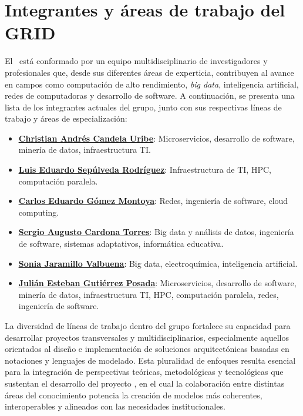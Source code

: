 

\section{Integrantes y áreas de trabajo del GRID}
El \GRID\ está conformado por un equipo multidisciplinario de investigadores y profesionales que, desde sus diferentes áreas de experticia, contribuyen al avance en campos como computación de alto rendimiento, \textit{big data}, inteligencia artificial, redes de computadoras y desarrollo de software. A continuación, se presenta una lista de los integrantes actuales del grupo, junto con sus respectivas líneas de trabajo y áreas de especialización:
\begin{itemize}
	\item \href{https://scienti.minciencias.gov.co/cvlac/visualizador/generarCurriculoCv.do?cod_rh=0000210897}{\underline{{\textbf{Christian Andrés Candela Uribe}}}}: Microservicios, desarrollo de software, minería de datos, infraestructura TI.\@
	\item \href{https://scienti.minciencias.gov.co/cvlac/visualizador/generarCurriculoCv.do?cod_rh=0001383939}{\underline{{\textbf{Luis Eduardo Sepúlveda Rodríguez}}}}: Infraestructura de TI, HPC, computación paralela.
	\item \href{https://scienti.minciencias.gov.co/cvlac/visualizador/generarCurriculoCv.do?cod_rh=0001343801}{\underline{{\textbf{Carlos Eduardo Gómez Montoya}}}}: Redes, ingeniería de software, cloud computing.
	\item \href{https://scienti.minciencias.gov.co/cvlac/visualizador/generarCurriculoCv.do?cod_rh=0001398775}{\underline{{\textbf{Sergio Augusto Cardona Torres}}}}: Big data y análisis de datos, ingeniería de software, sistemas adaptativos, informática educativa.
	\item \href{https://scienti.minciencias.gov.co/cvlac/visualizador/generarCurriculoCv.do?cod_rh=0000193550}{\underline{{\textbf{Sonia Jaramillo Valbuena}}}}: Big data, electroquímica, inteligencia artificial.
	\item \href{https://scienti.minciencias.gov.co/cvlac/visualizador/generarCurriculoCv.do?cod_rh=0000283495}{\underline{{\textbf{Julián Esteban Gutiérrez Posada}}}}: Microservicios, desarrollo de software, minería de datos, infraestructura TI, HPC, computación paralela, redes, ingeniería de software.
\end{itemize}

La diversidad de líneas de trabajo dentro del grupo fortalece su capacidad para desarrollar proyectos transversales y multidisciplinarios, especialmente aquellos orientados al diseño e implementación de soluciones arquitectónicas basadas en notaciones y lenguajes de modelado.
Esta pluralidad de enfoques resulta esencial para la integración de perspectivas teóricas, metodológicas y tecnológicas que sustentan el desarrollo del proyecto \NDITI, en el cual la colaboración entre distintas áreas del conocimiento potencia la creación de modelos más coherentes, interoperables y alineados con las necesidades institucionales.


